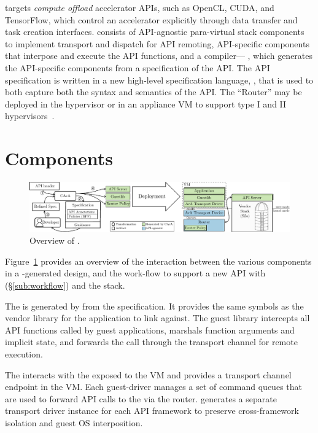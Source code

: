 \AvA targets \emph{compute offload} accelerator APIs, such as OpenCL, CUDA,
and TensorFlow, which control an accelerator explicitly through data transfer
and task creation interfaces. \AvA consists of API-agnostic para-virtual stack
components to implement transport and dispatch for API remoting, API-specific
components that interpose and execute the API functions, and a compiler---%
\CAvA, which generates the API-specific components from a specification of the
API. The API specification is written in a new high-level specification
language, \Lapis, that is used to both capture both the syntax and semantics
of the API. The ``Router'' may be deployed in the hypervisor or in an
appliance VM to support type I and II hypervisors~\cite{popek-goldberg}.

\section{\AvA Components}

\begin{figure}[t]
    \centering
    \includegraphics[width=\textwidth]{ava/images/overview.pdf}
    \caption{Overview of \AvA.}
    \label{fig:overview}
    \vspace*{-1em}
\end{figure}

Figure~\ref{fig:overview} provides an overview of the interaction between the
various components in a \AvA-generated design, and the work-flow to support a
new API with \AvA (\S\ref{sub:workflow}) and the \AvA stack.

The  is generated by \CAvA from the \Lapis
specification. It provides the same symbols as the vendor library for the
application to link against. The guest library intercepts all API functions
called by guest applications, marshals function arguments and implicit
state, and forwards the call through the transport channel for remote
execution.

The  interacts with the \vdev exposed to the
VM and provides a transport channel endpoint in the VM. Each guest-driver
manages a set of command queues that are used to forward API calls to the
\worker via the router. \CAvA generates a separate transport driver instance
for each API framework to preserve cross-framework isolation and guest OS
interposition.

